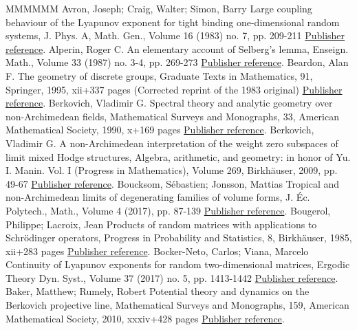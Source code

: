 \documentclass[11pt]{article}
\theoremstyle{definition}
\numberwithin{equation}{section}
\numberwithin{figure}{section}
\numberwithin{table}{section}
\begin{document}
\begin{thebibliography}{MMMMMM}
 Avron, Joseph; Craig, Walter; Simon, Barry Large coupling behaviour of the Lyapunov exponent for tight binding one-dimensional random systems, J. Phys. A, Math. Gen., Volume 16 (1983) no. 7, pp. 209-211 \href{https://ahl.centre-mersenne.org/item/AHL_2019__2__515_0/#avron-craig-simon}{Publisher reference}.
 Alperin, Roger C. An elementary account of Selberg’s lemma, Enseign. Math., Volume 33 (1987) no. 3-4, pp. 269-273 \href{https://ahl.centre-mersenne.org/item/AHL_2019__2__515_0/#alperin}{Publisher reference}.
 Beardon, Alan F. The geometry of discrete groups, Graduate Texts in Mathematics, 91, Springer, 1995, xii+337 pages (Corrected reprint of the 1983 original) \href{https://ahl.centre-mersenne.org/item/AHL_2019__2__515_0/#beardon}{Publisher reference}.
 Berkovich, Vladimir G. Spectral theory and analytic geometry over non-Archimedean fields, Mathematical Surveys and Monographs, 33, American Mathematical Society, 1990, x+169 pages \href{https://ahl.centre-mersenne.org/item/AHL_2019__2__515_0/#Ber}{Publisher reference}.
 Berkovich, Vladimir G. A non-Archimedean interpretation of the weight zero subspaces of limit mixed Hodge structures, Algebra, arithmetic, and geometry: in honor of Yu. I. Manin. Vol. I (Progress in Mathematics), Volume 269, Birkhäuser, 2009, pp. 49-67 \href{https://ahl.centre-mersenne.org/item/AHL_2019__2__515_0/#berko}{Publisher reference}.
 Boucksom, Sébastien; Jonsson, Mattias Tropical and non-Archimedean limits of degenerating families of volume forms, J. Éc. Polytech., Math., Volume 4 (2017), pp. 87-139 \href{https://ahl.centre-mersenne.org/item/AHL_2019__2__515_0/#boucksom-jonsson}{Publisher reference}.
 Bougerol, Philippe; Lacroix, Jean Products of random matrices with applications to Schrödinger operators, Progress in Probability and Statistics, 8, Birkhäuser, 1985, xii+283 pages \href{https://ahl.centre-mersenne.org/item/AHL_2019__2__515_0/#bougerol-lacroix}{Publisher reference}.
 Bocker-Neto, Carlos; Viana, Marcelo Continuity of Lyapunov exponents for random two-dimensional matrices, Ergodic Theory Dyn. Syst., Volume 37 (2017) no. 5, pp. 1413-1442 \href{https://ahl.centre-mersenne.org/item/AHL_2019__2__515_0/#bocker-viana}{Publisher reference}.
 Baker, Matthew; Rumely, Robert Potential theory and dynamics on the Berkovich projective line, Mathematical Surveys and Monographs, 159, American Mathematical Society, 2010, xxxiv+428 pages \href{https://ahl.centre-mersenne.org/item/AHL_2019__2__515_0/#baker-rumely}{Publisher reference}.

\end{thebibliography}
\end{document}
